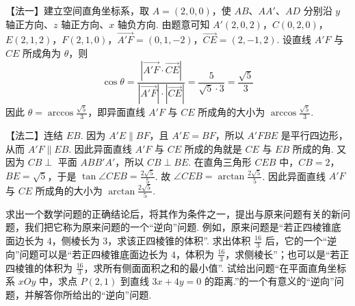 \begin{solution}
【法一】建立空间直角坐标系，取 \(A=(2,0,0)\)，使 \(AB\)、\(AA'\)、\(AD\) 分别沿 \(y\) 轴正方向、\(z\) 轴正方向、\(x\) 轴负方向. 由题意可知
\(A'(2,0,2)\)，\(C(0,2,0)\)，\(E(2,1,2)\)，\(F(2,1,0)\)，\(\overrightarrow{A'F}=(0,1,-2)\)，\(\overrightarrow{CE}=(2,-1,2)\).
设直线 \(A'F\) 与 \(CE\) 所成角为 \(\theta\)，则
\[
\cos\theta=
\frac{\left|\overrightarrow{A'F}\cdot\overrightarrow{CE}\right|}{\left|\overrightarrow{A'F}\right|\cdot\left|\overrightarrow{CE}\right|}
=\frac{5}{\sqrt{5}\cdot 3}
=\frac{\sqrt{5}}{3}
\]
因此 \(\theta=\arccos\frac{\sqrt{5}}{3}\)，即异面直线 \(A'F\) 与 \(CE\) 所成角的大小为 \(\arccos\frac{\sqrt{5}}{3}\).

【法二】连结 \(EB\). 因为 \(A'E\parallel BF\)，且 \(A'E=BF\)，所以 \(A'FBE\) 是平行四边形，从而 \(A'F\parallel EB\). 因此异面直线 \(A'F\) 与 \(CE\) 所成的角就是 \(CE\) 与 \(EB\) 所成的角. 又因为 \(CB\perp\) 平面 \(ABB'A'\)，所以 \(CB\perp BE\). 在直角三角形 \(CEB\) 中，\(CB=2\)，\(BE=\sqrt{5}\)，于是
\(\tan\angle CEB=\frac{2\sqrt{5}}{5}\).
故 \(\angle CEB=\arctan\frac{2\sqrt{5}}{5}\). 因此异面直线 \(A'F\) 与 \(CE\) 所成角的大小为 \(\arctan\frac{2\sqrt{5}}{5}\).
\end{solution}

\begin{problem}
求出一个数学问题的正确结论后，将其作为条件之一，提出与原来问题有关的新问题，我们把它称为原来问题的一个“逆向”问题. 例如，原来问题是“若正四棱锥底面边长为 \(4\)，侧棱长为 \(3\)，求该正四棱锥的体积”. 求出体积 \(\frac{16}{3}\) 后，它的一个“逆向”问题可以是“若正四棱锥底面边长为 \(4\)，体积为 \(\frac{16}{3}\)，求侧棱长”；也可以是“若正四棱锥的体积为 \(\frac{16}{3}\)，求所有侧面面积之和的最小值”. 试给出问题“在平面直角坐标系 \(xOy\) 中，求点 \(P(2,1)\) 到直线 \(3x+4y=0\) 的距离.”的一个有意义的“逆向”问题，并解答你所给出的“逆向”问题.
\end{problem}

